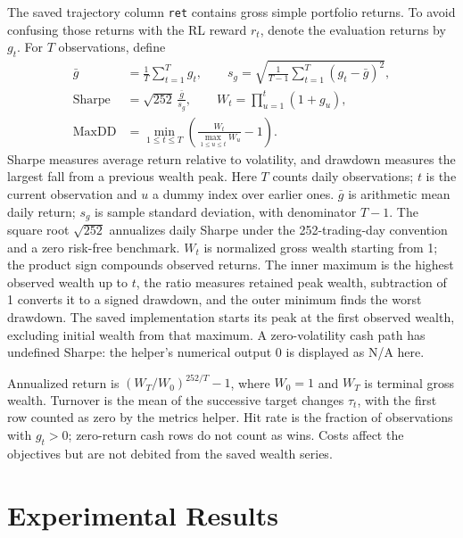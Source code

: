 \documentclass[11pt,a4paper]{article}
\begin{document}
The saved trajectory column \texttt{ret} contains gross simple portfolio returns. To avoid confusing those returns with the RL reward $r_t$, denote the evaluation returns by $g_t$. For $T$ observations, define
\begin{equation}
\begin{aligned}
 \bar g&=\frac1T\sum_{t=1}^{T}g_t,\qquad
 s_g=\sqrt{\frac{1}{T-1}\sum_{t=1}^{T}(g_t-\bar g)^2},\\
 \mathrm{Sharpe}&=\sqrt{252}\,\frac{\bar g}{s_g},\qquad
 W_t=\prod_{u=1}^{t}(1+g_u),\\
 \mathrm{MaxDD}&=\min_{1\le t\le T}
       \left(\frac{W_t}{\max_{1\le u\le t}W_u}-1\right).
\end{aligned}
\label{eq:metrics}
\end{equation}
Sharpe measures average return relative to volatility, and drawdown measures the largest fall from a previous wealth peak.
Here $T$ counts daily observations; $t$ is the current observation and $u$ a dummy index over earlier ones. $\bar g$ is arithmetic mean daily return; $s_g$ is sample standard deviation, with denominator $T-1$. The square root $\sqrt{252}$ annualizes daily Sharpe under the 252-trading-day convention and a zero risk-free benchmark. $W_t$ is normalized gross wealth starting from 1; the product sign compounds observed returns. The inner maximum is the highest observed wealth up to $t$, the ratio measures retained peak wealth, subtraction of 1 converts it to a signed drawdown, and the outer minimum finds the worst drawdown. The saved implementation starts its peak at the first observed wealth, excluding initial wealth from that maximum. A zero-volatility cash path has undefined Sharpe: the helper's numerical output 0 is displayed as N/A here.

Annualized return is $(W_T/W_0)^{252/T}-1$, where $W_0=1$ and $W_T$ is terminal gross wealth. Turnover is the mean of the successive target changes $\tau_t$, with the first row counted as zero by the metrics helper. Hit rate is the fraction of observations with $g_t>0$; zero-return cash rows do not count as wins. Costs affect the objectives but are not debited from the saved wealth series.

\section{Experimental Results}
\end{document}
